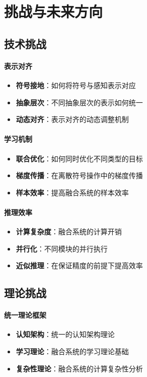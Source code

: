 \section{挑战与未来方向}

\subsection{技术挑战}

\paragraph{表示对齐}
\begin{itemize}
\item \textbf{符号接地}：如何将符号与感知表示对应
\item \textbf{抽象层次}：不同抽象层次的表示如何统一
\item \textbf{动态对齐}：表示对齐的动态调整机制
\end{itemize}

\paragraph{学习机制}
\begin{itemize}
\item \textbf{联合优化}：如何同时优化不同类型的目标
\item \textbf{梯度传播}：在离散符号操作中的梯度传播
\item \textbf{样本效率}：提高融合系统的样本效率
\end{itemize}

\paragraph{推理效率}
\begin{itemize}
\item \textbf{计算复杂度}：融合系统的计算开销
\item \textbf{并行化}：不同模块的并行执行
\item \textbf{近似推理}：在保证精度的前提下提高效率
\end{itemize}

\subsection{理论挑战}

\paragraph{统一理论框架}
\begin{itemize}
\item \textbf{认知架构}：统一的认知架构理论
\item \textbf{学习理论}：融合系统的学习理论基础
\item \textbf{复杂性理论}：融合系统的计算复杂性分析
\end{itemize}

